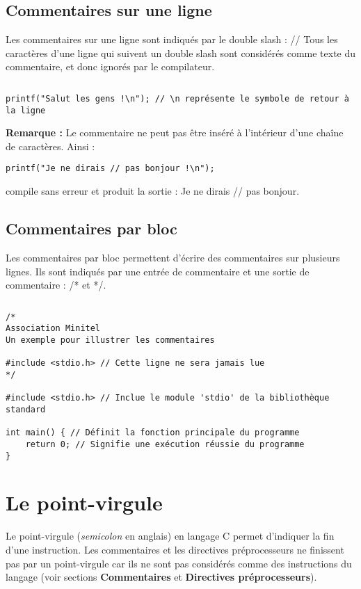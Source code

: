 \documentclass[../../../main.tex]{subfiles}
\begin{document}
\subsection{Commentaires sur une ligne}
Les commentaires sur une ligne sont indiqués par le double slash : \textsf{//} \newline
Tous les caractères d'une ligne qui suivent un double slash sont considérés comme texte du commentaire, et donc ignorés par le compilateur.
\begin{lstlisting}[title=Exemple]
\end{lstlisting}
\begin{verbatim}
printf("Salut les gens !\n"); // \n représente le symbole de retour à la ligne
\end{verbatim}
\textbf{Remarque :} Le commentaire ne peut pas être inséré à l'intérieur d'une chaîne de caractères. Ainsi :
\begin{verbatim}
printf("Je ne dirais // pas bonjour !\n");
\end{verbatim}
compile sans erreur et produit la sortie : \textsf{Je ne dirais // pas bonjour}.
\subsection{Commentaires par bloc}
Les commentaires par bloc permettent d'écrire des commentaires sur plusieurs lignes. Ils sont indiqués par une entrée de commentaire et une sortie de commentaire : \textsf{/*} et \textsf{*/}.
\begin{lstlisting}[title=Exemple]
\end{lstlisting}
\begin{verbatim}
/*
Association Minitel
Un exemple pour illustrer les commentaires

#include <stdio.h> // Cette ligne ne sera jamais lue
*/

#include <stdio.h> // Inclue le module 'stdio' de la bibliothèque standard

int main() { // Définit la fonction principale du programme
	return 0; // Signifie une exécution réussie du programme
}
\end{verbatim}
\section{Le point-virgule}
Le point-virgule (\textit{semicolon} en anglais) en langage C permet d'indiquer la fin d'une instruction. Les commentaires et les directives préprocesseurs ne finissent pas par un point-virgule car ils ne sont pas considérés comme des instructions du langage (voir sections \textbf{Commentaires} et \textbf{Directives préprocesseurs}).
 
\end{document}

